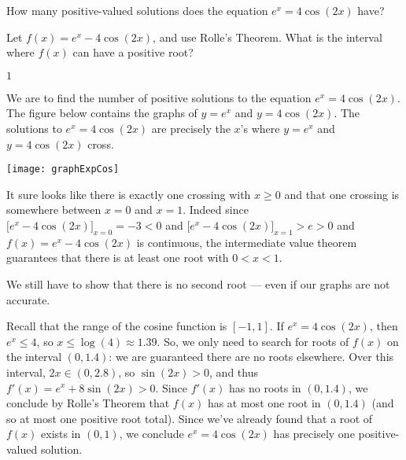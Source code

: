 \begin{question}
How many positive-valued solutions does the equation $e^x=4\cos(2x)$ have?
\end{question}
\begin{hint}
Let $f(x)=e^x-4\cos(2x)$, and use Rolle's Theorem. What is the interval where $f(x)$ can have a positive root?
\end{hint}
\begin{answer}
$1$
\end{answer}
\begin{solution}

We are to find the number of positive solutions to the equation
          $e^x = 4\cos(2x)$.  The figure below contains the graphs
          of $y=e^x$ and $y= 4\cos(2x)$. The solutions to
          $e^x =  4\cos(2x)$ are precisely the $x$'s where
          $y=e^x$ and $y= 4\cos(2x)$ cross.

\begin{center}
\texttt{[image: graphExpCos]}
\end{center}

         It sure looks like there is exactly one crossing with $x\ge 0$
         and that one crossing is somewhere between $x=0$ and $x=1$. Indeed
         since $\big[e^x- 4\cos(2x)\big]_{x=0} = -3<0$ and
               $\big[e^x- 4\cos(2x)\big]_{x=1} > e > 0$ and
         $f(x)=e^x- 4\cos(2x)$ is continuous, the intermediate value
         theorem guarantees that there is at least one root with
         $0<x<1$.

         We still have to show that there is no second root --- even if our
         graphs are not accurate.

Recall that the range of the cosine function is $[-1,1]$. If $e^x=4\cos(2x)$, then $e^x \leq 4$, so $x \leq \log(4)\approx 1.39$. So, we only need to search for roots of $f(x)$ on the interval $(0,1.4)$: we are guaranteed there are no roots elsewhere. Over this interval,
$2x \in (0,2.8)$, so $\sin(2x)>0$, and thus $f'(x)=e^x+8\sin(2 x)>0$. Since $f'(x)$ has no roots in $(0,1.4)$, we conclude by Rolle's Theorem that $f(x)$ has at most one root in $(0,1.4)$ (and so at most one positive root total). Since we've already found that a root of $f(x)$ exists in $(0,1)$, we conclude
 $e^x=4\cos(2x)$ has precisely one positive-valued solution.
\end{solution}




